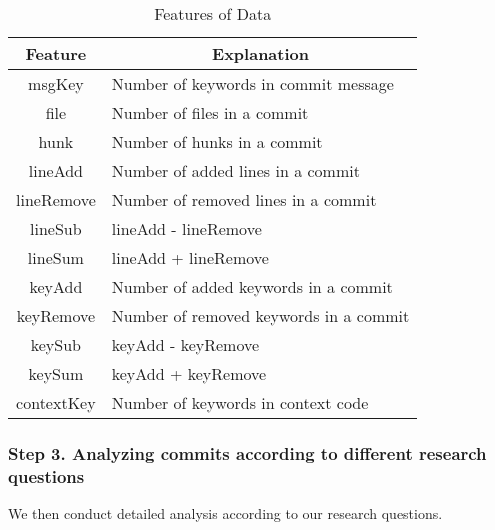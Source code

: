 

\begin{table}
	\centering
	\caption{Features of Data}\vspace*{-2ex}
	\label{table:feature}
	\begin{tabular}{|c|l|}\hline
		Feature&\multicolumn{1}{|c|}{Explanation}\\\hline
		msgKey&Number of keywords in commit message\\
		file&Number of files in a commit\\
		hunk&Number of hunks in a commit\\
		lineAdd&Number of added lines in a commit\\
		lineRemove&Number of removed lines in a commit\\
		lineSub&lineAdd - lineRemove\\
		lineSum&lineAdd + lineRemove\\
		keyAdd&Number of added keywords in a commit\\
		keyRemove&Number of removed keywords in a commit\\
		keySub&keyAdd - keyRemove\\
		keySum&keyAdd + keyRemove\\
		contextKey&Number of keywords in context code\\\hline
	\end{tabular}\vspace*{-3ex}
\end{table}

\subsubsection{Step 3. Analyzing commits according to different research questions} We then conduct detailed analysis according to our research questions.




